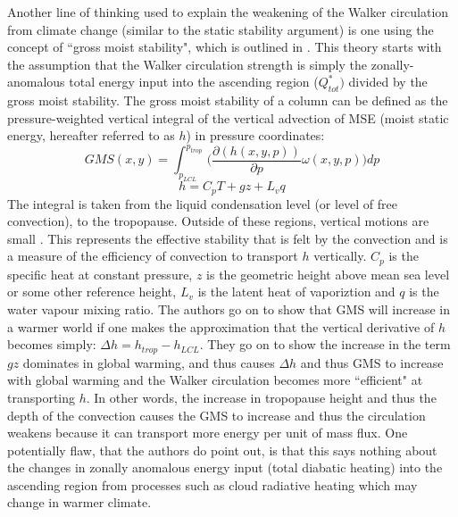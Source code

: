 \documentclass[letterpaper,12pt,titlepage,oneside,final]{book}
\begin{document}
Another line of thinking used to explain the weakening of the Walker circulation from climate change (similar to the static stability argument) is one using the concept of ``gross moist stability", which is outlined in \citep{wills_local_2017}. This theory starts with the assumption that the Walker circulation strength is simply the zonally-anomalous total energy input into the ascending region ($Q_{tot}^{*})$ divided by the gross moist stability. The gross moist stability of a column can be defined as the pressure-weighted vertical integral of the vertical advection of MSE (moist static energy, hereafter referred to as $h$) in pressure coordinates:
\begin{equation}\label{eq:GMS}
GMS(x,y) = \int_{p_{LCL}}^{p_{trop}}\bigg(\frac{\partial({h(x,y,p)})}{\partial{p}}\omega(x,y,p)\bigg){dp}
\end{equation}
\begin{equation}\label{eq:MSE}
h=C_{p}T + gz + L_{v}q
\end{equation}
The integral is taken from the liquid condensation level (or level of free convection), to the tropopause. Outside of these regions, vertical motions are small \citep{wills_local_2017}. This represents the effective stability that is felt by the convection and is a measure of the efficiency of convection to transport $h$ vertically. $C_{p}$ is the specific heat at constant pressure, $z$ is the geometric height above mean sea level or some other reference height, $L_{v}$ is the latent heat of vaporiztion and $q$ is the water vapour mixing ratio. The authors go on to show that GMS will increase in a warmer world if one makes the approximation that the vertical derivative of $h$ becomes simply: $\Delta{h} = h_{trop} - h_{LCL}$. They go on to show the increase in the term $gz$ dominates in global warming, and thus causes $\Delta{h}$ and thus GMS to increase with global warming and the Walker circulation becomes more ``efficient" at transporting $h$. In other words, the increase in tropopause height and thus the depth of the convection causes the GMS to increase and thus the circulation weakens because it can transport more energy per unit of mass flux. One potentially flaw, that the authors do point out, is that this says nothing about the changes in zonally anomalous energy input (total diabatic heating) into the ascending region from processes such as cloud radiative heating which may change in warmer climate.
\end{document}
